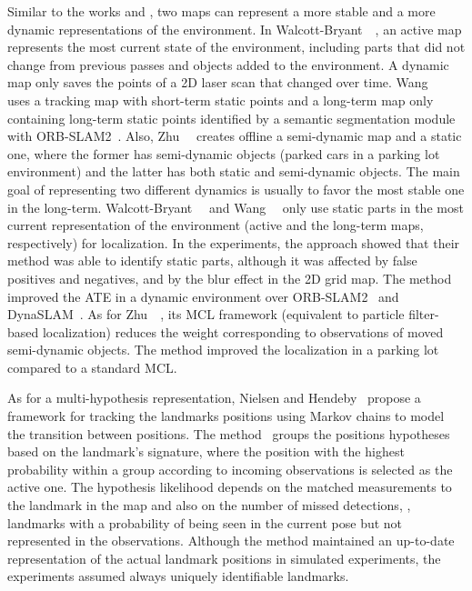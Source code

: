 Similar to the works \cite{dayoub-et-al:2011:013} and \cite{bacca-et-al:2013:003}, two maps can represent a more stable and a more dynamic representations of the environment.
In Walcott-Bryant~\etal~\cite{walcott-bryant-et-al:2012:6385561}, an active map represents the most current state of the environment, including parts that did not change from previous passes and objects added to the environment. A dynamic map only saves the points of a 2D laser scan that changed over time.
Wang~\etal~\cite{wang-et-al:2019:8793499} uses a tracking map with short-term static points and a long-term map only containing long-term static points identified by a semantic segmentation module with ORB-SLAM2~\cite{discussion:orb-slam2}.
Also, Zhu~\etal~\cite{zhu-et-al:2021:9561584} creates offline a semi-dynamic map and a static one, where the former has semi-dynamic objects (parked cars in a parking lot environment) and the latter has both static and semi-dynamic objects.
The main goal of representing two different dynamics is usually to favor the most stable one in the long-term.
Walcott-Bryant~\etal~\cite{walcott-bryant-et-al:2012:6385561} and Wang~\etal~\cite{wang-et-al:2019:8793499} only use static parts in the most current representation of the environment (active and the long-term maps, respectively) for localization.
In the experiments, the approach \cite{walcott-bryant-et-al:2012:6385561} showed that their method was able to identify static parts, although it was affected by false positives and negatives, and by the blur effect in the 2D grid map.
The method \cite{wang-et-al:2019:8793499} improved the \gls{ATE} in a dynamic environment over ORB-SLAM2~\cite{discussion:orb-slam2} and DynaSLAM~\cite{bescos-et-al:2018:2860039}.
As for Zhu~\etal~\cite{zhu-et-al:2021:9561584}, its \gls{MCL} framework (equivalent to particle filter-based localization) reduces the weight corresponding to observations of moved semi-dynamic objects. The method improved the localization in a parking lot compared to a standard \gls{MCL}.

As for a multi-hypothesis representation, Nielsen and Hendeby~\cite{nielsen-hendeby:2022:9841255} propose a framework for tracking the landmarks positions using Markov chains to model the transition between positions. The method~\cite{nielsen-hendeby:2022:9841255} groups the positions hypotheses based on the landmark's signature, where the position with the highest probability within a group according to incoming observations is selected as the active one. The hypothesis likelihood depends on the matched measurements to the landmark in the map and also on the number of missed detections, \ie, landmarks with a probability of being seen in the current pose but not represented in the observations.
Although the method \cite{nielsen-hendeby:2022:9841255} maintained an up-to-date representation of the actual landmark positions in simulated experiments, the experiments assumed always uniquely identifiable landmarks.




